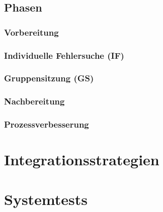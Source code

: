 \documentclass[a4paper]{article}
\theoremstyle{break}
\begin{document}
          \subsection{Phasen}
          \subsubsection{Vorbereitung}
          \subsubsection{Individuelle Fehlersuche (IF)}
\subsubsection{Gruppensitzung (GS)}
\subsubsection{Nachbereitung}
\subsubsection{Prozessverbesserung}
\section{Integrationsstrategien}
\section{Systemtests}
\end{document}
